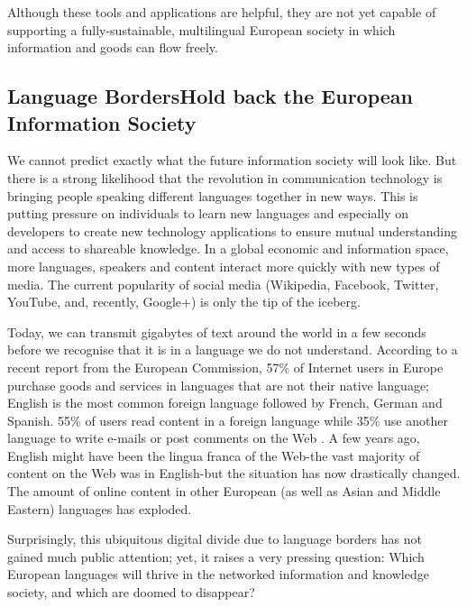 \documentclass[]{../../metanetpaper}
\begin{document}
\begin{multicols}{2}
Although these tools and applications are helpful, they are not yet capable of supporting a fully-sustainable, multilingual European society in which information and goods can flow freely.

\subsection[Language Borders Hold back the European Information Society]{Language Borders\newline Hold back the European Information Society}

We cannot predict exactly what the future information society will look like. But there is a strong likelihood that the revolution in communication technology is bringing people speaking different languages together in new ways. This is putting pressure on individuals to learn new languages and especially on developers to create new technology applications to ensure mutual understanding and access to shareable knowledge. In a global economic and information space, more languages, speakers and content interact more quickly with new types of media. The current popularity of social media (Wikipedia, Facebook, Twitter, YouTube, and, recently, Google+) is only the tip of the iceberg.


Today, we can transmit gigabytes of text around the world in a few seconds
before we recognise that it is in a language we do not understand. According
to a recent report from the European Commission, 57\% of Internet users in
Europe purchase goods and services in languages that are not their native
language; English is the most common foreign language followed by French,
German and Spanish. 55\% of users read content in a foreign language while
35\% use another language to write e-mails or post comments on the Web \cite{EC1}. A few
years ago, English might have been the lingua franca of the Web-the vast 
majority of content on the Web was in English-but the situation has now 
drastically changed. The amount of online content in other European (as well 
as Asian and Middle Eastern) languages has exploded.


Surprisingly, this ubiquitous digital divide due to language borders has not 
gained much public attention; yet, it raises a very pressing question: Which 
European languages will thrive in the networked information and knowledge
society, and which are doomed to disappear?



\end{multicols}
\end{document}
